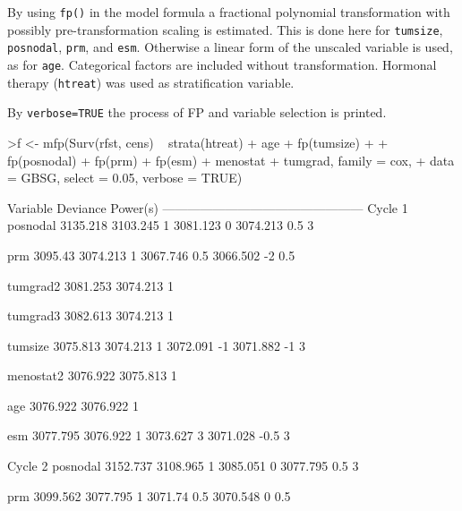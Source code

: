 \documentclass[11pt]{article}
\begin{document}
By using \texttt{fp()} in the model formula a fractional polynomial transformation with possibly
pre-transformation scaling is estimated. 
This is done here for \texttt{tumsize}, \texttt{posnodal}, \texttt{prm}, and \texttt{esm}.
Otherwise a linear form of the unscaled variable is used, as for \texttt{age}.
Categorical factors are included without transformation. 
Hormonal therapy ({\tt htreat}) was used as stratification variable.

By {\tt verbose=TRUE} the process of FP and variable selection is printed.
 
\begin{Schunk}
\begin{Sinput}
>f <- mfp(Surv(rfst, cens) ~ strata(htreat) + age + fp(tumsize) + 
+     fp(posnodal) + fp(prm) + fp(esm) + menostat + tumgrad, family = cox, 
+     data = GBSG, select = 0.05, verbose = TRUE)
\end{Sinput}
\begin{Soutput}
	Variable	Deviance	Power(s)
------------------------------------------------
Cycle 1
	posnodal	 	 	 
	        	3135.218	 
	        	3103.245	1
	        	3081.123	0
	        	3074.213	0.5 3

	prm	 	 	 	 
	        	3095.43	 	 
	        	3074.213	1
	        	3067.746	0.5
	        	3066.502	-2 0.5

	tumgrad2	 	 	 
	        	3081.253	 
	        	3074.213	1
	        			 		
	        			 		

	tumgrad3	 	 	 
	        	3082.613	 
	        	3074.213	1
	        			 		
	        			 		

	tumsize	 	 	 	 
	        	3075.813	 
	        	3074.213	1
	        	3072.091	-1
	        	3071.882	-1 3

	menostat2	 	 	 
	        	3076.922	 
	        	3075.813	1
	        			 		
	        			 		

	age	 	 	 	 
	        	3076.922	 
	        	3076.922	1
	        			 		
	        			 		

	esm	 	 	 	 
	        	3077.795	 
	        	3076.922	1
	        	3073.627	3
	        	3071.028	-0.5 3

Cycle 2
	posnodal	 	 	 
	        	3152.737	 
	        	3108.965	1
	        	3085.051	0
	        	3077.795	0.5 3

	prm	 	 	 	 
	        	3099.562	 
	        	3077.795	1
	        	3071.74	 	0.5
	        	3070.548	0 0.5


\end{Soutput}
\end{Schunk}
\end{document}
